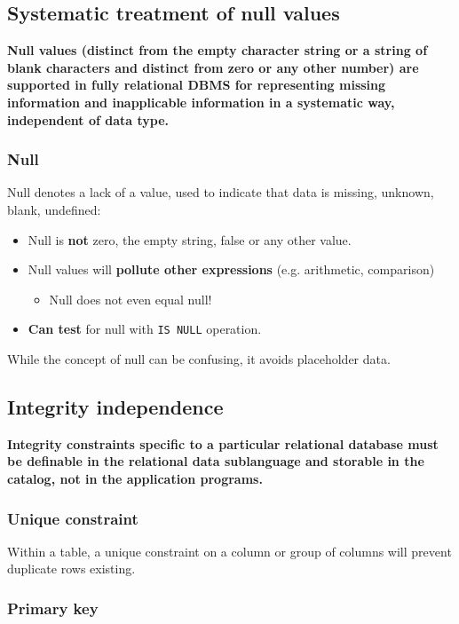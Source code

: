 \documentclass[slides]{pgnotes}
\begin{document}
\subsection{Systematic treatment of null values}
  \textbf{Null values (distinct from the empty character string or a string of blank characters and distinct from zero or any other number) are supported in fully relational DBMS for representing missing information and inapplicable information in a systematic way, independent of data type.}

\subsubsection{Null}

Null denotes a lack of a value, used to indicate that data is missing, unknown, blank, undefined:
\begin{itemize}
\item Null is \textbf{not} zero, the empty string, false or any other value.
\item Null values will \textbf{pollute other expressions} (e.g. arithmetic, comparison)
  \begin{itemize}
  \item Null does not even equal null!
  \end{itemize}
\item \textbf{Can test} for null with \texttt{IS NULL} operation.
\end{itemize}
While the concept of null can be confusing, it avoids placeholder data.



\subsection{Integrity independence}

\textbf{Integrity constraints specific to a particular relational database must be definable in the relational data sublanguage and storable in the catalog, not in the application programs.}

\subsubsection{Unique constraint}

Within a table, a unique constraint on a column or group of columns will prevent duplicate rows existing.  

\newpage

\subsubsection{Primary key}
\end{document}
